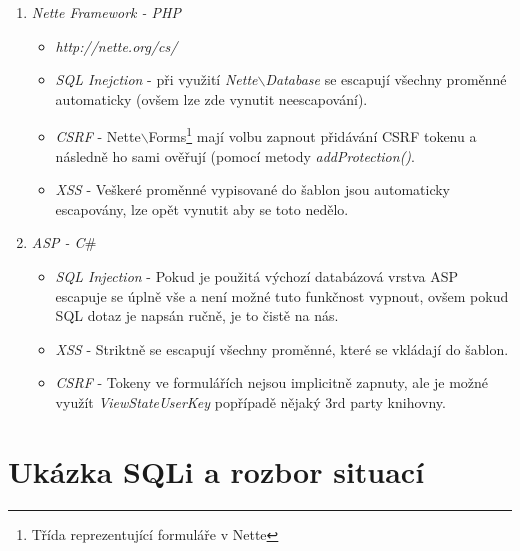 \documentclass[12pt, a4paper]{report}
\begin{document}
\begin{enumerate}
\begin{itemize}
\begin{itemize}
\item RAW queries - neescapují vůbec
\end{itemize}
\item \textit{CSRF} - Django obsahuje \textit{middleware}\footnote{Middleware je tzv.  v tomhle případě mezi jádrem Djanga a naší aplikací.}, který nám umožní přidávat CSRF token k formulářům a následně ho ověřovat %
\item \textit{XSS} - Šablony djanga automaticky escapují proměnné, ale ne vše (více informací na: \textit{https://docs.djangoproject.com/en/dev/topics/ security/}
\end{itemize}
\item \textit{Nette Framework - PHP}
\begin{itemize}
\item \textit{http://nette.org/cs/}
\item \textit{SQL Inejction}  - při využití \textit{Nette$\backslash$Database} se escapují všechny proměnné automaticky (ovšem lze zde vynutit neescapování).
\item \textit{CSRF} - Nette$\backslash$Forms\footnote{Třída reprezentující formuláře v Nette} mají volbu zapnout přidávání CSRF tokenu a následně ho sami ověřují (pomocí metody \textit{addProtection()}.
\item \textit{XSS} - Veškeré proměnné vypisované do šablon jsou automaticky escapovány, lze opět vynutit aby se toto nedělo.
\end{itemize}
 
\item \textit{ASP - C$\#$}
\begin{itemize}
\item \textit{SQL Injection} - Pokud je použitá výchozí databázová vrstva ASP escapuje se úplně vše a není možné tuto funkčnost vypnout, ovšem pokud SQL dotaz je napsán ručně, je to čistě na nás.
\item \textit{XSS} - Striktně se escapují všechny proměnné, které se vkládají do šablon.
\item \textit{CSRF} - Tokeny ve formulářích nejsou implicitně zapnuty, ale je možné využít \textit{ViewStateUserKey} popřípadě nějaký 3rd party knihovny.
\end{itemize}
\end{enumerate}

\chapter{Ukázka SQLi a rozbor situací}
\end{document}
